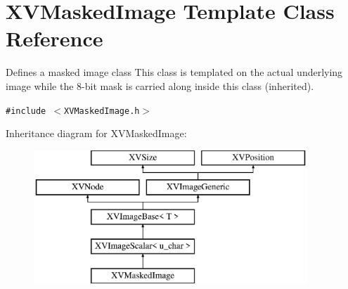 \hypertarget{class_XVMaskedImage}{
\section{XVMasked\-Image  Template Class Reference}
\label{XVMaskedImage}
}
Defines a masked image class This class is templated on the actual underlying image while the 8-bit mask is carried along inside this class (inherited). 


{\tt \#include $<$XVMasked\-Image.h$>$}

Inheritance diagram for XVMasked\-Image:\begin{figure}[H]
\begin{center}
\leavevmode
\includegraphics[height=5cm]{class_XVMaskedImage}
\end{center}
\end{figure}
